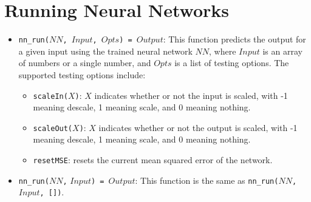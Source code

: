 \section{Running Neural Networks}
\begin{itemize}
\item \texttt{nn\_run($NN$, $Input$, $Opts$) = $Output$}: This function predicts the output for a given input using the trained neural network $NN$, where $Input$ is an array of numbers or a single number, and $Opts$ is a list of testing options. The supported testing options include:
\begin{itemize}
\item \texttt{scaleIn($X$)}: $X$ indicates whether or not the input is scaled, with -1 meaning descale, 1 meaning scale, and 0 meaning nothing.
\item \texttt{scaleOut($X$)}: $X$ indicates whether or not the output is scaled,  with -1 meaning descale, 1 meaning scale, and 0 meaning nothing.	
\item \texttt{resetMSE}: resets the current mean squared error of the network.
\end{itemize}

\item \texttt{nn\_run($NN$,} \texttt{$Input$) = $Output$}: This function is the same as \texttt{nn\_run($NN$,} \texttt{$Input$, [])}.
\end{itemize}

\ignore{

}
